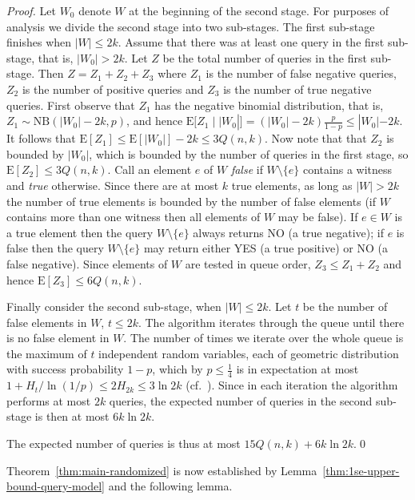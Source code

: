 \documentclass[11pt]{article}
\begin{document}
\begin{proof}
Let $W_0$ denote $W$ at the beginning of the second stage. 
For purposes of analysis we divide the second stage into 
two sub-stages. The first sub-stage finishes when $|W|\le 2k$. 
Assume that there was at least one query in the first sub-stage, 
that is, $|W_0|>2k$.
Let $Z$ be the total number of queries in the first sub-stage.
Then $Z=Z_1+Z_2+Z_3$ where $Z_1$ is the number of false negative queries, 
$Z_2$ is the number of positive queries and $Z_3$ is the number of true 
negative queries. First observe that $Z_1$ has the negative binomial 
distribution, that is, $Z_1\sim \mathrm{NB}(|W_0|-2k,p)$, 
and hence $\mathrm{E}[Z_1\;|\;|W_0|]=(|W_0|-2k)\tfrac{p}{1-p}\le |W_0|-2k$. 
It follows that $\mathrm{E}[Z_1] \le \mathrm{E}[|W_0|]-2k \leq 3Q(n,k)$.
Now note that that $Z_2$ is bounded by $|W_0|$, which is bounded by 
the number of queries in the first stage, so $\mathrm{E}[Z_2]\leq 3Q(n,k)$. 
Call an element $e$ of $W$ {\em false} if $W\setminus\{e\}$ contains 
a witness and {\em true} otherwise. Since there are at most 
$k$ true elements, as long as $|W|>2k$ the number of true elements is 
bounded by the number of false elements (if $W$ contains more than 
one witness then all elements of $W$ may be false). 
If $e\in W$ is a true element then the query $W\setminus\{e\}$ 
always returns NO (a true negative); if $e$ is false then 
the query $W\setminus\{e\}$ may return either YES (a true positive)
or NO (a false negative). 
Since elements of $W$ are tested in queue order, $Z_3 \le Z_1+Z_2$ 
and hence $\mathrm{E}[Z_3]\leq 6Q(n,k)$.

Finally consider the second sub-stage, when $|W|\le 2k$. 
Let $t$ be the number of false elements in $W$, $t\le 2k$.
The algorithm iterates through the queue until there is no false element 
in $W$. The number of times we iterate over the whole queue is the maximum 
of $t$ independent random variables, each of geometric distribution 
with success probability $1-p$, which by $p\leq \frac{1}4$ is in expectation 
at most $1+H_t/\ln(1/p)\leq 2H_{2k}\leq 3\ln 2k$ 
(cf.~\cite{Eisenberg2008}). Since in each iteration the algorithm 
performs at most $2k$ queries, the expected number of queries in the second 
sub-stage is then at most $6k\ln 2k$.

The expected number of queries is thus at most $15Q(n,k)+6k\ln 2k$.\qed 
\end{proof}

Theorem~\ref{thm:main-randomized} is now established by
Lemma~\ref{thm:1se-upper-bound-query-model} and the following lemma.
\end{document}
